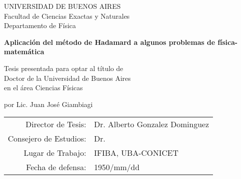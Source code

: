 \documentclass[main.tex]{subfiles}
\begin{document}
\centering
\Large

UNIVERSIDAD DE BUENOS AIRES \\
Facultad de Ciencias Exactas y Naturales \\
Departamento de Física
\vfill
\begin{LARGE}
    \textbf{Aplicación del método de Hadamard a algunos problemas de física-matemática}
\end{LARGE}
\vfill
Tesis presentada para optar al título de \\
Doctor de la Universidad de Buenos Aires \\
en el área Ciencias Físicas
\vfill
\begin{LARGE}
por Lic. Juan José Giambiagi
\end{LARGE}
\vfill
\begin{tabular}{r l}
    Director de Tesis: & Dr. Alberto Gonzalez Dominguez \\
    Consejero de Estudios: & Dr. \dotfill \\
    Lugar de Trabajo: & IFIBA, UBA-CONICET \\
    Fecha de defensa: & 1950/mm/dd
\end{tabular}
\vfill
\end{document}
